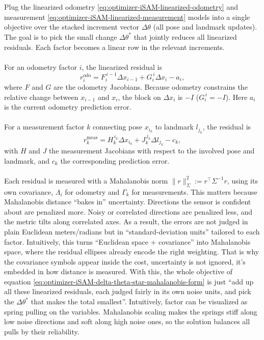 \\ \\
Plug the linearized odometry \eqref{eq:optimizer-iSAM-linearized-odometry} and measurement \eqref{eq:optimizer-iSAM-linearized-measurement} models into a single objective over the stacked increment vector $\Delta\theta$ (all pose and landmark updates). The goal is to pick the small change $\Delta\theta^{*}$ that jointly reduces all linearized residuals. Each factor becomes a linear row in the relevant increments. 
\\ \\
For an odometry factor $i$, the linearized residual is
$$
r_i^{\text{odo}}=F_i^{\,i-1}\Delta x_{i-1}+G_i^{\,i}\Delta x_i-a_i,
$$
where $F$ and $G$ are the odometry Jacobians. Because odometry constrains the relative change between $x_{i-1}$ and $x_i$, the block on $\Delta x_i$ is $-I$ ($G_i^{\,i}=-I$). Here $a_i$ is the current odometry prediction error.
\\ \\
For a measurement factor $k$ connecting pose $x_{i_k}$ to landmark $l_{j_k}$, the residual is
$$
r_k^{\text{meas}}=H_k^{\,i_k}\Delta x_{i_k}+J_k^{\,j_k}\Delta l_{j_k}-c_k,
$$
with $H$ and $J$ the measurement Jacobians with respect to the involved pose and landmark, and $c_k$ the corresponding prediction error.
\\ \\
Each residual is measured with a Mahalanobis norm $\|r\|_{\Sigma}^2 := r^\top \Sigma^{-1} r$, using its own covariance, $\Lambda_i$ for odometry and $\Gamma_k$ for measurements. This matters because Mahalanobis distance ``bakes in'' uncertainty. Directions the sensor is confident about are penalized more. Noisy or correlated directions are penalized less, and the metric tilts along correlated axes. As a result, the errors are not judged in plain Euclidean meters/radians but in ``standard-deviation units'' tailored to each factor. Intuitively, this turns ``Euclidean space + covariance'' into Mahalanobis space, where the residual ellipses already encode the right weighting. That is why the covariance symbols appear inside the cost, uncertainty is not ignored, it's embedded in how distance is measured. With this, the whole objective of equation \eqref{eq:optimizer-iSAM-delta-theta-star-mahalanobis-form} is just ``add up all these linearized residuals, each judged fairly in its own noise units, and pick the $\Delta\theta^{*}$ that makes the total smallest''. Intuitively, factor can be visualized as spring pulling on the variables. Mahalanobis scaling makes the springs stiff along low noise directions and soft along high noise ones, so the solution balances all pulls by their reliability.

